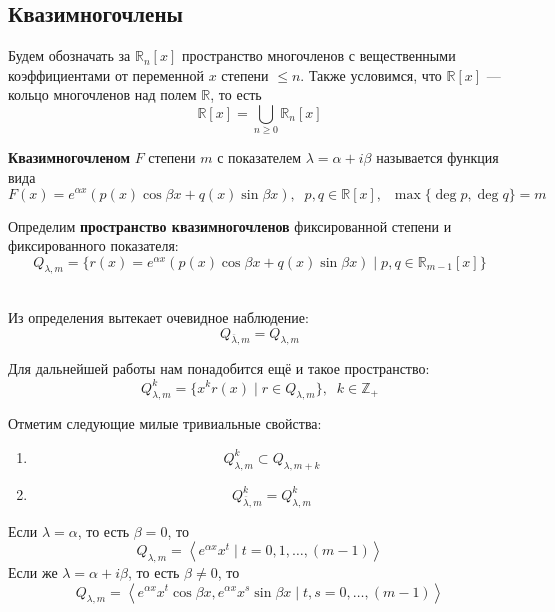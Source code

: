 \documentclass[11pt]{article}
\begin{document}
\subsection{Квазимногочлены}

Будем обозначать за $\mathbb{R}_n[x]$ пространство многочленов с вещественными коэффициентами от переменной $x$ степени $\leq n$. Также условимся, что $\mathbb{R}[x]$ --- кольцо многочленов над полем $\mathbb{R}$, то есть
\[\mathbb{R}[x] = \bigcup_{n \geq 0} \mathbb{R}_n[x]\]

\begin{definition}
    \textbf{Квазимногочленом} $F$ степени $m$ с показателем $\lambda = \alpha + i \beta$ называется функция вида
    \[F(x) = e^{\alpha x} (p(x) \cos \beta x + q(x) \sin \beta x), \; \; p, q \in \mathbb{R}[x], \; \; \max \{\deg p, \deg q\} = m\]
\end{definition}

\begin{definition}
    Определим \textbf{пространство квазимногочленов} фиксированной степени и фиксированного показателя:
    \[Q_{\lambda, m} = \{r(x) = e^{\alpha x} (p(x) \cos \beta x + q(x) \sin \beta x) \; | \; p, q \in \mathbb{R}_{m - 1}[x]\} \]
\end{definition} \leavevmode
\\
Из определения вытекает очевидное наблюдение:
\[Q_{\overline{\lambda}, m} = Q_{\lambda, m}\]

\begin{definition}
    Для дальнейшей работы нам понадобится ещё и такое пространство:
    \[Q_{\lambda, m}^k = \{x^k r(x) \; | \; r \in Q_{\lambda, m}\}, \; \; k \in \mathbb{Z}_{+}\]
\end{definition}

\begin{remark}
    Отметим следующие милые тривиальные свойства:
    \begin{enumerate}
        \item \[Q_{\lambda, m}^k \subset Q_{\lambda, m + k}\]
        \item \[Q_{\overline{\lambda}, m}^k = Q_{\lambda, m}^k\]
    \end{enumerate}
\end{remark}

\begin{remark}
    Если $\lambda = \alpha$, то есть $\beta = 0$, то
    \[Q_{\lambda, m} = \left\langle e^{\alpha x} x^t \; | \; t = 0, 1, \ldots, (m - 1)\right\rangle \]
    Если же $\lambda = \alpha + i \beta$, то есть $\beta \neq 0$, то 
    \[Q_{\lambda, m} = \left\langle e^{\alpha x} x^t \cos \beta x, e^{\alpha x} x^s \sin \beta x \; | \; t, s = 0, \ldots, (m - 1)\right\rangle \]
\end{remark}
\end{document}
